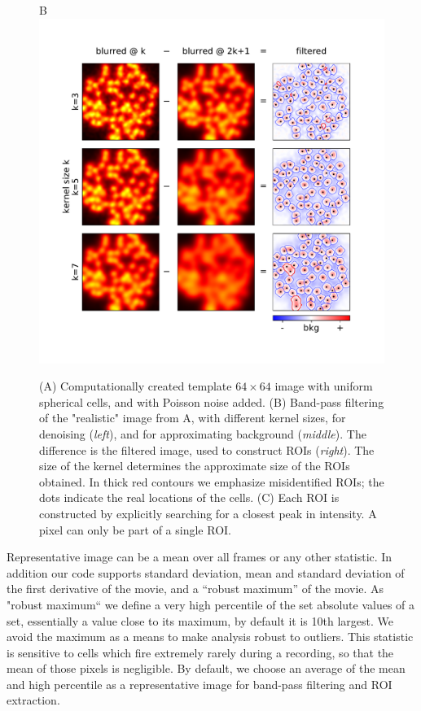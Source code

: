 \documentclass[a4paper,11pt,oneside,]{article}
\begin{document}
\begin{figure}[t]
\begin{minipage}{.25\textwidth}
\end{minipage}
\begin{minipage}{.6\textwidth}
    \vskip 7mm
    {\selectfont B} \includegraphics[scale=.5,align=t,trim=10mm 15mm 20mm 15mm, clip]{figures/regions_kernels.pdf}
\end{minipage}
\caption{
(A) Computationally created template $64{\times}64$ image with uniform spherical cells, and with Poisson noise added.
(B) Band-pass filtering of the "realistic" image from A, with different kernel sizes, for denoising  ({\it left}), and  for approximating background  ({\it middle}).
The difference is the filtered image, used to construct ROIs ({\it right}).
The size of the kernel determines the approximate size of the ROIs obtained.
In thick red contours we emphasize misidentified ROIs; the dots indicate the real locations of the cells.
(C) Each ROI is constructed by explicitly searching for a closest peak in intensity. A pixel can only be part of a single ROI.
\label{fig:regions}}
\end{figure}

Representative image can be a mean over all frames or any other statistic.
In addition our code supports standard deviation, mean and standard deviation of the first derivative of the movie, and a ``robust maximum'' of the movie.
As "robust maximum`` we define a very high percentile of the set absolute values of a set, essentially a value close to its maximum, by default it is 10th largest. 
We avoid the maximum as a means to make analysis robust to outliers.
This statistic is sensitive to cells which fire extremely rarely during a recording, so that the mean of those pixels is negligible.
By default, we choose an average of the mean and high percentile as a representative image for band-pass filtering and ROI extraction.
\end{document}
